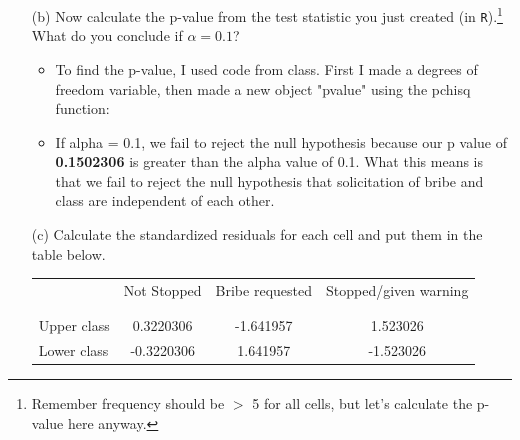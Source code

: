 \documentclass[12pt,letterpaper]{article}
\begin{document}
\begin{enumerate}
	
	\item [(b)]
	Now calculate the p-value from the test statistic you just created (in \texttt{R}).\footnote{Remember frequency should be $>$ 5 for all cells, but let's calculate the p-value here anyway.}  What do you conclude if $\alpha = 0.1$?\\
	
		\begin{itemize}
			\item To find the p-value, I used code from class. First I made a degrees of freedom variable, then made a new object "pvalue" using the pchisq function:
				
				
			\item If alpha = 0.1, we fail to reject the null hypothesis because our p value of \textbf{0.1502306} is greater than the alpha value of 0.1. What this means is that we fail to reject the null hypothesis that solicitation of bribe and class are independent of each other.
		\end{itemize}
	  	
	
	\newpage
	\item [(c)] Calculate the standardized residuals for each cell and put them in the table below.
	\vspace{1cm}
	
	\begin{table}[h]
		\centering
			\begin{tabular} {l | c c c }
			& Not Stopped & Bribe requested & Stopped/given warning \\
			\\[-1.8ex] 
			\hline \\[-1.8ex]
			Upper class & 0.3220306 & -1.641957  & 1.523026 \\
			Lower class & -0.3220306 & 1.641957 & -1.523026 \\
			\hline
			\end{tabular}
	\end{table}
	

\end{enumerate}
\end{document}
